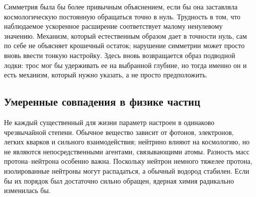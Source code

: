 Симметрия была бы более привычным объяснением, если бы она заставляла космологическую постоянную обращаться точно в нуль. Трудность в том, что наблюдаемое ускоренное расширение соответствует малому ненулевому значению. Механизм, который естественным образом дает в точности нуль, сам по себе не объясняет крошечный остаток; нарушение симметрии может просто вновь ввести тонкую настройку. Здесь вновь возвращается образ подводной лодки: трос мог бы удерживать ее на выбранной глубине, но тогда именно он и есть механизм, который нужно указать, а не просто предположить.

\begin{classroomqa}
\end{classroomqa}

\begin{classroomqa}
\end{classroomqa}

\subsection{Умеренные совпадения в физике частиц}

Не каждый существенный для жизни параметр настроен в одинаково чрезвычайной степени. Обычное вещество зависит от фотонов, электронов, легких кварков и сильного взаимодействия; нейтрино влияют на космологию, но не являются непосредственными агентами, связывающими атомы. Разность масс протона--нейтрона особенно важна. Поскольку нейтрон немного тяжелее протона, изолированные нейтроны могут распадаться, а обычный водород стабилен. Если бы их порядок был достаточно сильно обращен, ядерная химия радикально изменилась бы.

